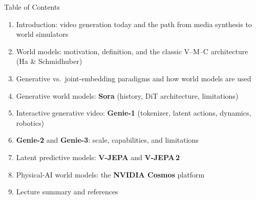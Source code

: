 \begin{frame}{Table of Contents}
  \begin{enumerate}\itemsep0.15em
    \item Introduction: video generation today and the path from media synthesis to world simulators
    \item World models: motivation, definition, and the classic V--M--C architecture (Ha \& Schmidhuber)
    \item Generative vs.\ joint-embedding paradigms and how world models are used
    \item Generative world models: \textbf{Sora} (history, DiT architecture, limitations)
    \item Interactive generative video: \textbf{Genie-1} (tokenizer, latent actions, dynamics, robotics)
    \item \textbf{Genie-2} and \textbf{Genie-3}: scale, capabilities, and limitations
    \item Latent predictive models: \textbf{V-JEPA} and \textbf{V-JEPA\,2}
    \item Physical-AI world models: the \textbf{NVIDIA Cosmos} platform
    \item Lecture summary and references
  \end{enumerate}
\end{frame}
